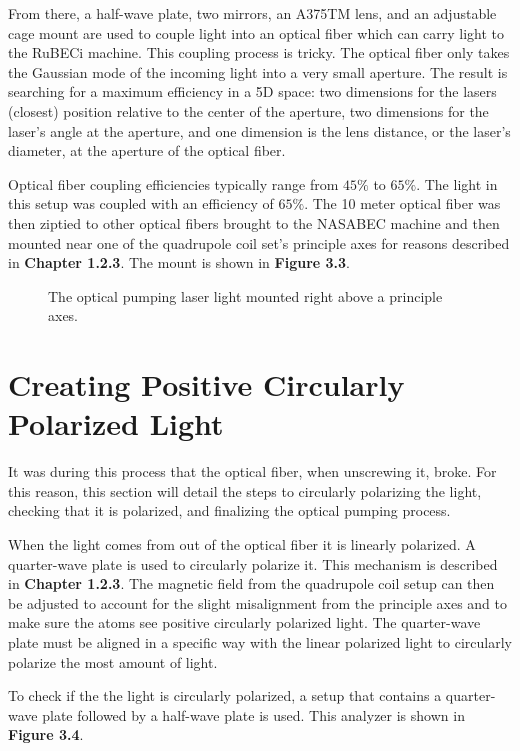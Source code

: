 From there, a half-wave plate, two mirrors, an A375TM lens, and an adjustable cage mount are used to couple light into an optical fiber which can carry light to the RuBECi machine. This coupling process is tricky. The optical fiber only takes the Gaussian mode of the incoming light into a very small aperture. The result is searching for a maximum efficiency in a 5D space: two dimensions for the lasers (closest) position relative to the center of the aperture, two dimensions for the laser's angle at the aperture, and one dimension is the lens distance, or the laser's diameter, at the aperture of the optical fiber. 

 Optical fiber coupling efficiencies typically range from $45\%$ to $65\%$. The light in this setup was coupled with an efficiency of $65\%$. The 10 meter optical fiber was then ziptied to other optical fibers brought to the NASABEC machine and then mounted near one of the quadrupole coil set's principle axes for reasons described in \textbf{Chapter 1.2.3}. The mount is shown in \textbf{Figure 3.3}.

 \begin{figure}[h!]
\begin{center}
\end{center}
\caption{The optical pumping laser light mounted right above a principle axes. }
\end{figure}

 \section{Creating Positive Circularly Polarized Light}
 It was during this process that the optical fiber, when unscrewing it, broke. For this reason, this section will detail the steps to circularly polarizing the light, checking that it is polarized, and finalizing the optical pumping process. 

 When the light comes from out of the optical fiber it is linearly polarized. A quarter-wave plate is used to circularly polarize it. This mechanism is described in \textbf{Chapter 1.2.3}. The magnetic field from the quadrupole coil setup can then be adjusted to account for the slight misalignment from the principle axes and to make sure the atoms see positive circularly polarized light. The quarter-wave plate must be aligned in a specific way with the linear polarized light to circularly polarize the most amount of light. 
 
 To check if the the light is circularly polarized, a setup that contains a quarter-wave plate followed by a half-wave plate is used. This analyzer is shown in \textbf{Figure 3.4}. 


